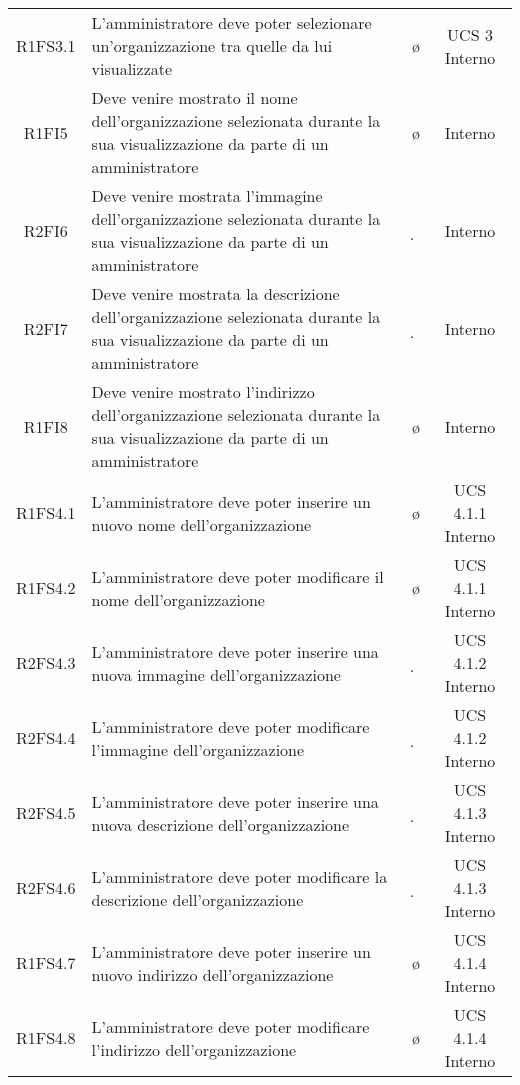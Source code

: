 {\begin{longtable}{ c C{4cm} c c}
R1FS3.1 & L'amministratore deve poter selezionare un'organizzazione tra quelle da lui visualizzate & \o & UCS 3 Interno\\

R1FI5 & Deve venire mostrato il nome dell'organizzazione selezionata durante la sua visualizzazione da parte di un amministratore & \o & Interno\\

R2FI6 & Deve venire mostrata l'immagine dell'organizzazione selezionata durante la sua visualizzazione da parte di un amministratore & \d & Interno\\

R2FI7 & Deve venire mostrata la descrizione dell'organizzazione selezionata durante la sua visualizzazione da parte di un amministratore & \d & Interno\\

R1FI8 & Deve venire mostrato l'indirizzo dell'organizzazione selezionata durante la sua visualizzazione da parte di un amministratore & \o & Interno\\

R1FS4.1 & L'amministratore deve poter inserire un nuovo nome dell'organizzazione & \o & UCS 4.1.1 Interno\\

R1FS4.2 & L'amministratore deve poter modificare il nome dell'organizzazione & \o & UCS 4.1.1 Interno\\

R2FS4.3 & L'amministratore deve poter inserire una nuova immagine dell'organizzazione & \d & UCS 4.1.2 Interno\\

R2FS4.4 & L'amministratore deve poter modificare l'immagine dell'organizzazione & \d & UCS 4.1.2 Interno\\

R2FS4.5 & L'amministratore deve poter inserire una nuova descrizione dell'organizzazione & \d & UCS 4.1.3 Interno\\

R2FS4.6 & L'amministratore deve poter modificare la descrizione dell'organizzazione & \d & UCS 4.1.3 Interno\\

R1FS4.7 & L'amministratore deve poter inserire un nuovo indirizzo dell'organizzazione & \o & UCS 4.1.4 Interno\\

R1FS4.8 & L'amministratore deve poter modificare l'indirizzo dell'organizzazione & \o & UCS 4.1.4 Interno\\


\end{longtable}}
